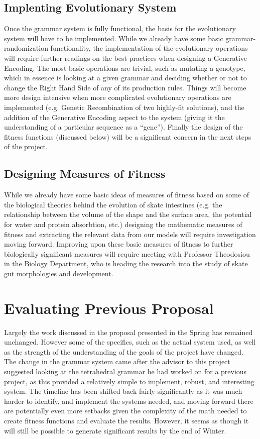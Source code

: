 \documentclass[condensed]{union-cs-thesis}
\begin{document}
\subsection{Implenting Evolutionary System}
Once the grammar system is fully functional, the basis for the evolutionary system will have to be implemented.  While we already have some basic grammar-randomization functionality, the implementation of the evolutionary operations will require further readings on the best practices when designing a Generative Encoding.  The most basic operations are trivial, such as mutating a genotype, which in essence is looking at a given grammar and deciding whether or not to change the Right Hand Side of any of its production rules.  Things will become more design intensive when more complicated evolutionary operations are implemented (e.g. Genetic Recombination of two highly-fit solutions), and the addition of the Generative Encoding aspect to the system (giving it the understanding of a particular sequence as a ``gene'').  Finally the design of the fitness functions (discussed below) will be a significant concern in the next steps of the project.

\subsection{Designing Measures of Fitness}
While we already have some basic ideas of measures of fitness based on some of the biological theories behind the evolution of skate intestines (e.g. the relationship between the volume of the shape and the surface area, the potential for water and protein absorbtion, etc.) designing the mathematic measures of fitness and extracting the relevant data from our models will require investigation moving forward.  Improving upon these basic measures of fitness to further biologically significant measures will require meeting with Professor Theodosiou in the Biology Department, who is heading the research into the study of skate gut morphologies and development.


\section{Evaluating Previous Proposal}
\par
Largely the work discussed in the proposal presented in the Spring has remained unchanged.  However some of the specifics, such as the actual system used, as well as the strength of the understanding of the goals of the project have changed.  The change in the grammar system came after the advisor to this project suggested looking at the tetrahedral grammar he had worked on for a previous project, as this provided a relatively simple to implement, robust, and interesting system.  The timeline has been shifted back fairly significantly as it was much harder to identify, and implement the systems needed, and moving forward there are potentially even more setbacks given the complexity of the math needed to create fitness functions and evaluate the results.  However, it seems as though it will still be possible to generate significant results by the end of Winter.




\end{document}
